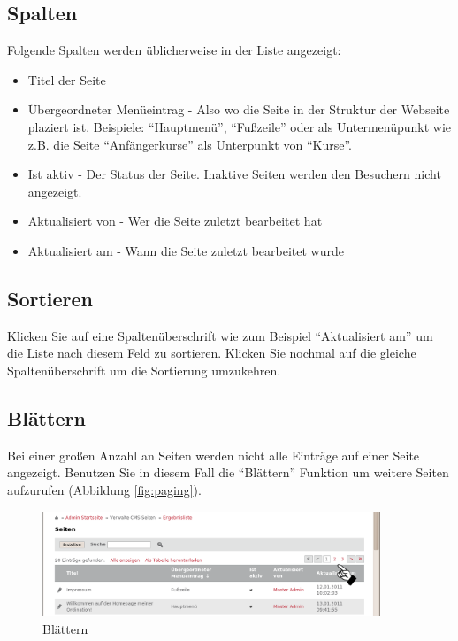 \documentclass[article, a4paper, oneside, 11pt]{memoir}
\begin{document}
\subsection{Spalten}

Folgende Spalten werden üblicherweise in der Liste angezeigt:

\begin{itemize}
\item Titel der Seite
\item Übergeordneter Menüeintrag - Also wo die Seite in der Struktur der Webseite plaziert ist. Beispiele: "`Hauptmenü"', "`Fußzeile"' oder als Untermenüpunkt wie z.B. die Seite "`Anfängerkurse"' als Unterpunkt von "`Kurse"'.
\item Ist aktiv - Der Status der Seite. Inaktive Seiten werden den Besuchern nicht angezeigt.
\item Aktualisiert von - Wer die Seite zuletzt bearbeitet hat
\item Aktualisiert am - Wann die Seite zuletzt bearbeitet wurde
\end{itemize}


\subsection{Sortieren}

Klicken Sie auf eine Spaltenüberschrift wie zum Beispiel "`Aktualisiert am"' um die Liste nach diesem Feld zu sortieren. Klicken Sie nochmal auf die gleiche Spaltenüberschrift um die Sortierung umzukehren.


\subsection{Blättern}

Bei einer großen Anzahl an Seiten werden nicht alle Einträge auf einer Seite angezeigt. Benutzen Sie in diesem Fall die "`Blättern"' Funktion um weitere Seiten aufzurufen (Abbildung \vref{fig:paging}).

\begin{figure}[htp]
\centering
\includegraphics[width=0.9\textwidth]{paging}
\caption{Blättern}
\label{fig:paging}
\end{figure}
\end{document}
